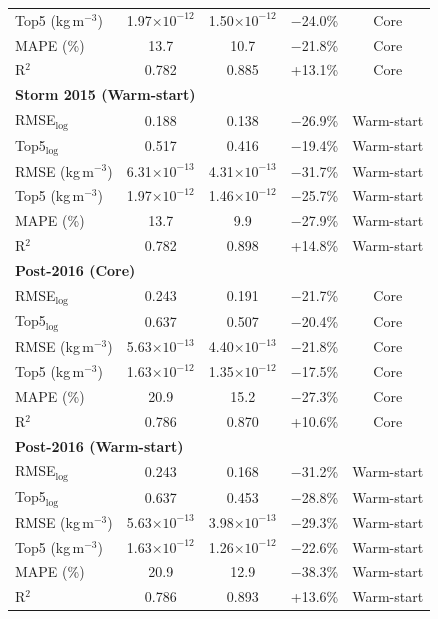 \begin{table}[!ht]
\begin{tabular}{lcccc}
Top5 (kg\,m$^{-3}$) & 1.97$\times10^{-12}$ & 1.50$\times10^{-12}$ & $-$24.0\% & Core \\
MAPE (\%) & 13.7 & 10.7 & $-$21.8\% & Core \\
R$^2$ & 0.782 & 0.885 & +13.1\% & Core \\
\hline
\multicolumn{5}{l}{\textbf{Storm 2015 (Warm-start)}} \\
RMSE$_{\log}$ & 0.188 & 0.138 & $-$26.9\% & Warm-start \\
Top5$_{\log}$ & 0.517 & 0.416 & $-$19.4\% & Warm-start \\
RMSE (kg\,m$^{-3}$) & 6.31$\times10^{-13}$ & 4.31$\times10^{-13}$ & $-$31.7\% & Warm-start \\
Top5 (kg\,m$^{-3}$) & 1.97$\times10^{-12}$ & 1.46$\times10^{-12}$ & $-$25.7\% & Warm-start \\
MAPE (\%) & 13.7 & 9.9 & $-$27.9\% & Warm-start \\
R$^2$ & 0.782 & 0.898 & +14.8\% & Warm-start \\
\hline \hline
\multicolumn{5}{l}{\textbf{Post-2016 (Core)}} \\
RMSE$_{\log}$ & 0.243 & 0.191 & $-$21.7\% & Core \\
Top5$_{\log}$ & 0.637 & 0.507 & $-$20.4\% & Core \\
RMSE (kg\,m$^{-3}$) & 5.63$\times10^{-13}$ & 4.40$\times10^{-13}$ & $-$21.8\% & Core \\
Top5 (kg\,m$^{-3}$) & 1.63$\times10^{-12}$ & 1.35$\times10^{-12}$ & $-$17.5\% & Core \\
MAPE (\%) & 20.9 & 15.2 & $-$27.3\% & Core \\
R$^2$ & 0.786 & 0.870 & +10.6\% & Core \\
\hline
\multicolumn{5}{l}{\textbf{Post-2016 (Warm-start)}} \\
RMSE$_{\log}$ & 0.243 & 0.168 & $-$31.2\% & Warm-start \\
Top5$_{\log}$ & 0.637 & 0.453 & $-$28.8\% & Warm-start \\
RMSE (kg\,m$^{-3}$) & 5.63$\times10^{-13}$ & 3.98$\times10^{-13}$ & $-$29.3\% & Warm-start \\
Top5 (kg\,m$^{-3}$) & 1.63$\times10^{-12}$ & 1.26$\times10^{-12}$ & $-$22.6\% & Warm-start \\
MAPE (\%) & 20.9 & 12.9 & $-$38.3\% & Warm-start \\
R$^2$ & 0.786 & 0.893 & +13.6\% & Warm-start \\
\hline
\end{tabular}
\end{table}
